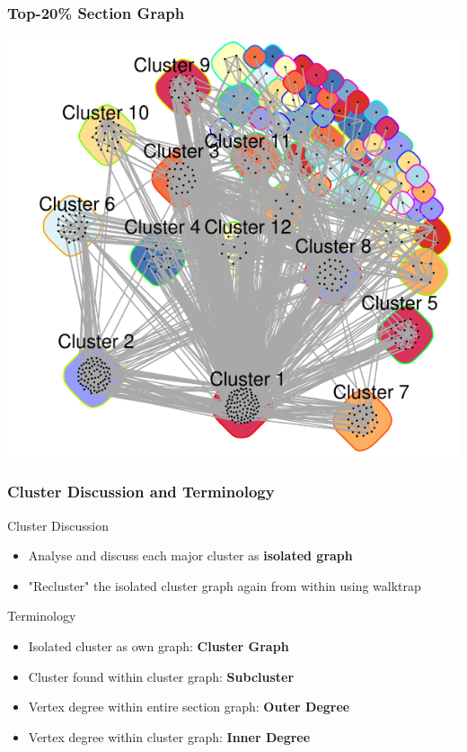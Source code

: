 \documentclass{beamer}
\begin{document}
	\begin{frame}
	\frametitle{Top-20\% Section Graph}
	\begin{center}
	\includegraphics[scale=0.6]{pics/final_graph_with_texts_cropped.pdf}
	\end{center}
	\end{frame}



	\begin{frame}
	\frametitle{Cluster Discussion and Terminology}
		\begin{alertblock}{Cluster Discussion}
			\begin{itemize}
				\item Analyse and discuss each major cluster as \textbf{isolated graph}
				\item "Recluster" the isolated cluster graph again from within using walktrap
			\end{itemize}
		\end{alertblock}
		
		\begin{block}{Terminology}
			\begin{itemize}
				\item Isolated cluster as own graph: \textbf{Cluster Graph}
				\item Cluster found within cluster graph: \textbf{Subcluster}
				\item Vertex degree within entire section graph: \textbf{Outer Degree}
				\item Vertex degree within cluster graph: \textbf{Inner Degree}
			\end{itemize}
		\end{block}
	\end{frame}
\end{document}
